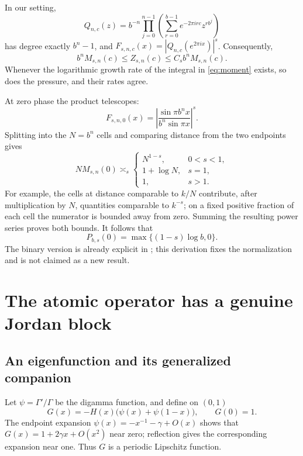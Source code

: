 \documentclass[11pt,a4paper]{article}
\numberwithin{equation}{section}
\theoremstyle{definition}
\theoremstyle{remark}
\begin{document}
In our setting,
\begin{equation}
 Q_{n,c}(z)=b^{-n}\prod_{j=0}^{n-1}
 \left(\sum_{r=0}^{b-1}e^{-2\pi i r c}z^{r b^j}\right)
 \label{eq:digital-polynomial}
\end{equation}
has degree exactly $b^n-1$, and $F_{s,n,c}(x)=|Q_{n,c}(e^{2\pi ix})|^s$.
Consequently,
\begin{equation}
 b^n M_{s,n}(c)\le Z_{s,n}(c)\le C_s b^nM_{s,n}(c).
 \label{eq:pressure-comparison}
\end{equation}
Whenever the logarithmic growth rate of the integral in \cref{eq:moment}
exists, so does the pressure, and their rates agree.

At zero phase the product telescopes:
\begin{equation}
 F_{s,n,0}(x)=\left|\frac{\sin\pi b^n x}{b^n\sin\pi x}\right|^s.
 \label{eq:telescoping}
\end{equation}
Splitting into the $N=b^n$ cells and comparing distance from the two
endpoints gives
\begin{equation}
 NM_{s,n}(0)\asymp_s
 \begin{cases}
 N^{1-s},&0<s<1,\\
 1+\log N,&s=1,\\
 1,&s>1.
 \end{cases}
 \label{eq:atomic-growth}
\end{equation}
For example, the cells at distance comparable to $k/N$ contribute,
after multiplication by $N$, quantities comparable to $k^{-s}$;
on a fixed positive fraction of each cell the numerator is bounded away
from zero. Summing the resulting power series proves both bounds.
It follows that
\begin{equation}
 P_{b,s}(0)=\max\{(1-s)\log b,0\}.
 \label{eq:atomic-pressure}
\end{equation}
The binary version is already explicit in \cite{GKS}; this derivation
fixes the normalization and is not claimed as a new result.

\section{The atomic operator has a genuine Jordan block}
\label{sec:jordan}

\subsection{An eigenfunction and its generalized companion}
Let $\psi=\Gamma'/\Gamma$ be the digamma function, and define on $(0,1)$
\begin{equation}
 G(x)=-H(x)\bigl(\psi(x)+\psi(1-x)\bigr),\qquad G(0)=1.
 \label{eq:G}
\end{equation}
The endpoint expansion $\psi(x)=-x^{-1}-\gamma+O(x)$ shows that
$G(x)=1+2\gamma x+O(x^2)$ near zero; reflection gives the corresponding
expansion near one. Thus $G$ is a periodic Lipschitz function.
\end{document}
